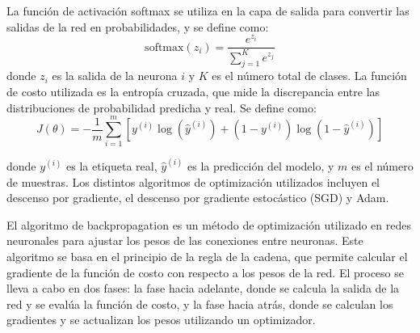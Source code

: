 \documentclass[11pt]{article}
\begin{document}
La función de activación softmax se utiliza en la capa de salida para convertir las salidas de la red en probabilidades, y se define como:
\[
\text{softmax}(z_i) = \frac{e^{z_i}}{\sum_{j=1}^{K} e^{z_j}}
\]
donde \( z_i \) es la salida de la neurona \( i \) y \( K \) es el número total de clases.
La función de costo utilizada es la entropía cruzada, que mide la discrepancia entre las distribuciones de probabilidad predicha y real. Se define como:
\[
J(\theta) = -\frac{1}{m} \sum_{i=1}^m \left[ y^{(i)} \log(\hat{y}^{(i)}) + (1 - y^{(i)}) \log(1 - \hat{y}^{(i)}) \right]
\]

donde \( y^{(i)} \) es la etiqueta real, \( \hat{y}^{(i)} \) es la predicción del modelo, y \( m \) es el número de muestras.
Los distintos algoritmos de optimización utilizados incluyen el descenso por gradiente, el descenso por gradiente estocástico (SGD) y Adam.

El algoritmo de backpropagation es un método de optimización utilizado en redes neuronales para ajustar los pesos de las conexiones entre neuronas. Este algoritmo se basa en el principio de la regla de la cadena, que permite calcular el gradiente de la función de costo con respecto a los pesos de la red. El proceso se lleva a cabo en dos fases: la fase hacia adelante, donde se calcula la salida de la red y se evalúa la función de costo, y la fase hacia atrás, donde se calculan los gradientes y se actualizan los pesos utilizando un optimizador.
\end{document}
